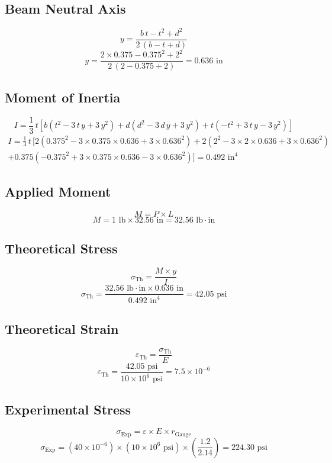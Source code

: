 \documentclass{article}
\begin{document}
    \subsection{Beam Neutral Axis}
    \[y=\frac{b\,t-t^2+d^2}{2\,(b-t+d)}\]
    \[y=\frac{2\times0.375-0.375^2+2^2}{2\,(2-0.375+2)}=\boxed{0.636\text{ in}}\]
    \subsection{Moment of Inertia}
    \[I=\frac{1}{3}\,t\left[b\left(t^2-3\,t\,y+3\,y^2\right)+d\left(d^2-3\,d\,y+3\,y^2\right)+t\left(-t^2+3\,t\,y-3\,y^2\right)\right]\]
    \begin{multline*}
        I=\frac{1}{3}\,t\,[2\left(0.375^2-3\times0.375\times0.636+3\times0.636^2\right)+2\left(2^2-3\times2\times0.636+3\times0.636^2\right)\\+0.375\left(-0.375^2+3\times0.375\times0.636-3\times0.636^2\right)]=\boxed{0.492\text{ in}^4}
    \end{multline*}
    
    \subsection{Applied Moment}
    \[M=P\times L\]
    \[M=1\text{ lb}\times 32.56\text{ in}=\boxed{32.56\text{ lb}\cdot\text{in}}\]
    \subsection{Theoretical Stress}
    \[\sigma_\text{Th}=\frac{M\times y}{I}\]
    \[\sigma_\text{Th}=\frac{32.56\text{ lb}\cdot\text{in}\times 0.636\text{ in}}{0.492\text{ in}^4}=\boxed{42.05\text{ psi}}\]
    \subsection{Theoretical Strain}
    \[\varepsilon_\text{Th}=\frac{\sigma_\text{Th}}{E}\]
    \[\varepsilon_\text{Th}=\frac{42.05\text{ psi}}{10\times10^6\text{ psi}}=\boxed{7.5\times10^{-6}}\]
    \subsection{Experimental Stress}
    \[\sigma_\text{Exp}=\varepsilon\times E\times r_\text{Gauge}\]
    \[\sigma_\text{Exp}=\left(40\times10^{-6}\right)\times \left(10\times10^6\text{ psi}\right)\times\left(\frac{1.2}{2.14}\right)=\boxed{224.30 \text{ psi}}\]
    \newpage
\end{document}

